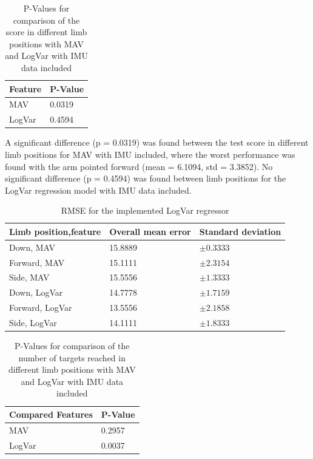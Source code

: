 	\begin{table}[!thpb]	
		\begin{center}
			\begin{tabular}{l l}
				\hline
				\textbf{Feature} & \textbf{P-Value}\\
				\hline
				MAV & 0.0319 \\
				LogVar & 0.4594 \\
				\hline
			\end{tabular}
			\caption{P-Values for comparison of the score in different limb positions with MAV and LogVar with IMU data included}
		\end{center}
	\end{table}
	
	A significant difference (p = 0.0319) was found between the test score in different limb positions for MAV with IMU included, where the worst performance was found with the arm pointed forward (mean = 6.1094, std = 3.3852). No significant difference (p = 0.4594) was found between limb positions for the LogVar regression model with IMU data included.
	
	\begin{table}[!thpb]
		\begin{center}
			\begin{tabular}{l l l}
				\hline
				\textbf{Limb position,feature} & \textbf{Overall mean error} & \textbf{Standard deviation}\\
				\hline
				Down, MAV & 15.8889 & $\pm 0.3333$ \\
				Forward, MAV & 15.1111 & $\pm 2.3154$ \\
				Side, MAV & 15.5556 & $\pm 1.3333$ \\
				Down, LogVar & 14.7778 & $\pm 1.7159$ \\
				Forward, LogVar & 13.5556 & $\pm 2.1858$ \\
				Side, LogVar & 14.1111 & $\pm 1.8333$ \\
				\hline
			\end{tabular}
			\caption{RMSE for the implemented LogVar regressor}
		\end{center}
	\end{table}
	
	\begin{table}[!thpb]
		\begin{center}
			\begin{tabular}{l l}
				\hline
				\textbf{Compared Features} & \textbf{P-Value}\\
				\hline
				MAV & 0.2957 \\
				LogVar & 0.0037 \\
				\hline
			\end{tabular}
			\caption{P-Values for comparison of the number of targets reached in different limb positions with MAV and LogVar with IMU data included}
		\end{center}
	\end{table}
	
